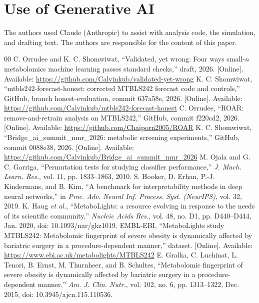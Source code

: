 \documentclass[conference]{IEEEtran}
\begin{document}
\section*{Use of Generative AI}
The authors used Claude (Anthropic) to assist with analysis code, the
simulation, and drafting text. The authors are responsible for the content
of this paper.

\begin{thebibliography}{00}
 C. Orrudee and K. C. Shomwiwat, ``Validated, yet wrong: Four ways small-$n$ metabolomics machine learning passes standard checks,'' draft, 2026. [Online]. Available: \url{https://github.com/Calvinkub/validated-yet-wrong}
 K. C. Shomwiwat, ``mtbls242-forecast-honest: corrected MTBLS242 forecast code and controls,'' GitHub, branch honest-evaluation, commit 637a58e, 2026. [Online]. Available: \url{https://github.com/Calvinkub/mtbls242-forecast-honest}
 C. Orrudee, ``ROAR: remove-and-retrain analysis on MTBLS242,'' GitHub, commit f220cd2, 2026. [Online]. Available: \url{https://github.com/Chaiporn2005/ROAR}
 K. C. Shomwiwat, ``Bridge\_ai\_summit\_nmr\_2026: metabolic screening experiments,'' GitHub, commit 0088e38, 2026. [Online]. Available: \url{https://github.com/Calvinkub/Bridge_ai_summit_nmr_2026}
 M. Ojala and G. C. Garriga, ``Permutation tests for studying classifier performance,'' \textit{J. Mach. Learn. Res.}, vol. 11, pp. 1833--1863, 2010.
 S. Hooker, D. Erhan, P.-J. Kindermans, and B. Kim, ``A benchmark for interpretability methods in deep neural networks,'' in \textit{Proc. Adv. Neural Inf. Process. Syst. (NeurIPS)}, vol. 32, 2019.
 K. Haug \textit{et al.}, ``MetaboLights: a resource evolving in response to the needs of its scientific community,'' \textit{Nucleic Acids Res.}, vol. 48, no. D1, pp. D440--D444, Jan. 2020, doi: 10.1093/nar/gkz1019.
 EMBL-EBI, ``MetaboLights study MTBLS242: Metabolomic fingerprint of severe obesity is dynamically affected by bariatric surgery in a procedure-dependent manner,'' dataset. [Online]. Available: \url{https://www.ebi.ac.uk/metabolights/MTBLS242}
 E. Gralka, C. Luchinat, L. Tenori, B. Ernst, M. Thurnheer, and B. Schultes, ``Metabolomic fingerprint of severe obesity is dynamically affected by bariatric surgery in a procedure-dependent manner,'' \textit{Am. J. Clin. Nutr.}, vol. 102, no. 6, pp. 1313--1322, Dec. 2015, doi: 10.3945/ajcn.115.110536.

\end{thebibliography}
\end{document}

